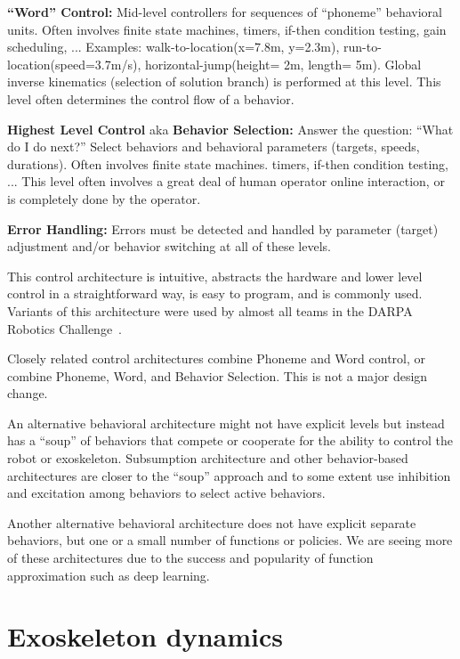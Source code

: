 \documentclass[letterpaper,12pt,fullpage]{article}
\begin{document}
{\bf ``Word'' Control:} Mid-level controllers for sequences of ``phoneme'' behavioral
units.
Often involves finite state machines, timers, if-then condition testing, gain
scheduling, ...
Examples: walk-to-location(x=7.8m, y=2.3m), run-to-location(speed=3.7m/s),
horizontal-jump(height= 2m, length= 5m).
Global inverse kinematics (selection of solution branch) is performed at this level.
This level often determines the control flow of a behavior.

{\bf Highest Level Control} aka {\bf Behavior Selection:} 
Answer the question: ``What do I do next?''
Select behaviors and behavioral parameters (targets,
speeds, durations).
Often involves finite state machines. timers, if-then condition testing, ...
This level often involves a great deal of human operator online interaction,
or is completely done by the operator.

{\bf Error Handling:} Errors must be detected and handled by parameter (target)
adjustment and/or behavior switching
at all of these levels.

This control architecture is intuitive, abstracts the hardware 
and lower level control in a straightforward way, is easy to program, and is
commonly used. Variants of this architecture were used by almost all teams
in the DARPA Robotics Challenge~\cite{}.

Closely related control architectures combine Phoneme and Word control,
or combine Phoneme, Word, and Behavior Selection.
This is not a major design change.

An alternative behavioral architecture might not have explicit levels but instead
has a ``soup'' of behaviors that compete or cooperate for the ability to
control the robot or exoskeleton. Subsumption architecture and other behavior-based
architectures are closer to the ``soup'' approach and to some extent
use inhibition and excitation
among behaviors to select active behaviors.

Another alternative behavioral architecture does not have explicit separate behaviors,
but one or a small number of functions or policies. 
We are seeing more of these architectures
due to the success and popularity of function approximation such as
deep learning.

\section{Exoskeleton dynamics}
\end{document}
